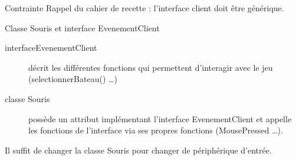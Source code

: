 \begin{frame}[c]
\begin{block}{Contrainte}
Rappel du cahier de recette : l'interface client doit être générique. \\
\end{block}

\begin{block}{Classe Souris et interface EvenementClient}
\begin{description}
\item[interfaceEvenementClient] décrit les différentes fonctions qui permettent d'interagir avec le jeu (selectionnerBateau() \dots{})
\item[classe Souris] possède un attribut implémentant l'interface EvenementClient et appelle les fonctions de l'interface via ses propres fonctions (MousePressed \dots{}).
\end{description}
Il suffit de changer la classe Souris pour changer de périphérique d'entrée.
\end{block}
\end{frame}
